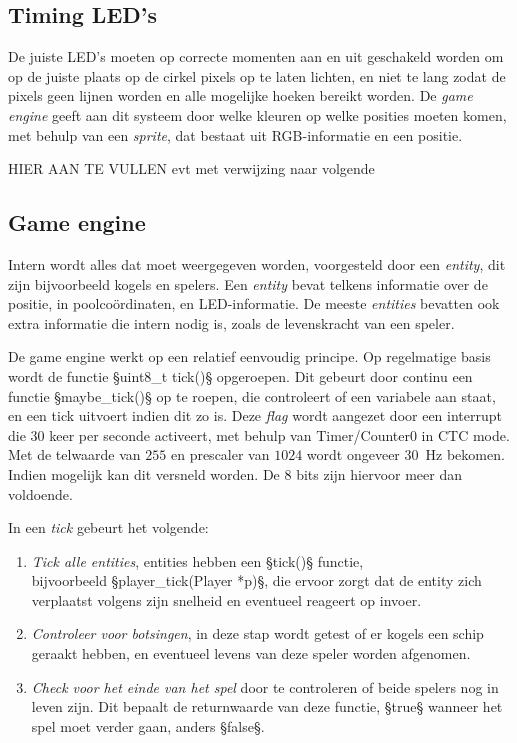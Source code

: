 \documentclass[12pt]{ugentreport}
\begin{document}
\subsection{Timing LED's}
\label{sec:ledtiming}
De juiste LED's moeten op correcte momenten aan en uit geschakeld worden
om op de juiste plaats op de cirkel pixels op te laten lichten,
en niet te lang zodat de pixels geen lijnen worden en alle mogelijke hoeken
bereikt worden. De \emph{game engine} geeft aan dit systeem door welke kleuren
op welke posities moeten komen, met behulp van een \emph{sprite}, dat bestaat
uit RGB-informatie en een positie.

HIER AAN TE VULLEN evt met verwijzing naar volgende

\subsection{Game engine}
Intern wordt alles dat moet weergegeven worden, voorgesteld door een
\emph{entity}, dit zijn bijvoorbeeld kogels en spelers. Een \emph{entity} bevat
telkens informatie over de positie, in poolcoördinaten, en LED-informatie. De
meeste \emph{entities} bevatten ook extra informatie die intern nodig is, zoals
de levenskracht van een speler.

De game engine werkt op een relatief eenvoudig principe.
Op regelmatige basis wordt de functie §uint8_t tick()§
opgeroepen. Dit gebeurt door continu een functie §maybe_tick()§ op te roepen,
die controleert of een variabele aan staat, en een tick uitvoert indien dit zo
is. Deze \emph{flag} wordt aangezet door een interrupt die 30 keer per seconde
activeert, met behulp van Timer/Counter0 in CTC mode. Met de telwaarde van $255$
en prescaler van $1024$ wordt ongeveer \SI{30}{\hertz} bekomen. Indien mogelijk
kan dit versneld worden. De 8 bits zijn hiervoor meer dan voldoende.

In een \emph{tick} gebeurt het volgende:
\begin{enumerate}
\item \emph{Tick alle entities}, entities hebben een §tick()§ functie,\\
  bijvoorbeeld §player_tick(Player *p)§, die ervoor zorgt dat de entity zich
  verplaatst volgens zijn snelheid en eventueel reageert op invoer.

\item \emph{Controleer voor botsingen}, in deze stap wordt getest of er
  kogels een schip geraakt hebben, en eventueel levens van deze speler worden
  afgenomen.

\item \emph{Check voor het einde van het spel} door te controleren of beide
  spelers nog in leven zijn. Dit bepaalt de returnwaarde van deze functie,
  §true§ wanneer het spel moet verder gaan, anders §false§.
\end{enumerate}
\end{document}
